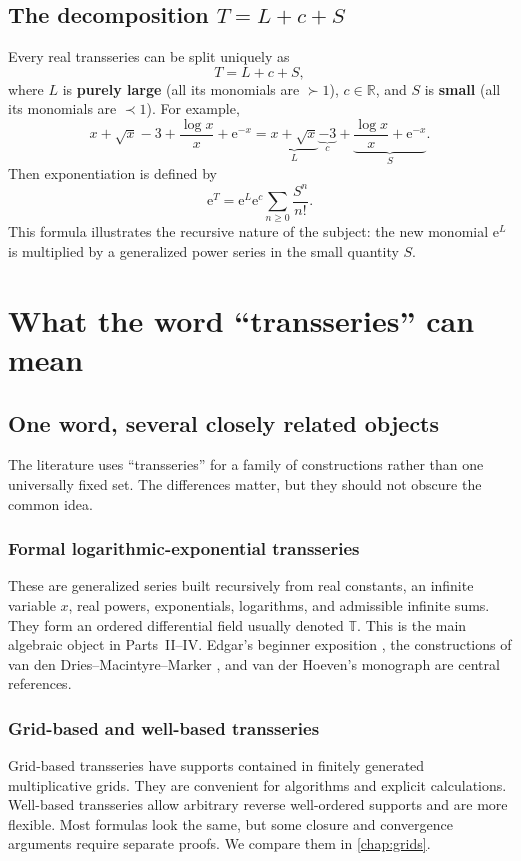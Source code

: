 \documentclass[11pt,openany]{book}
\theoremstyle{plain}
\theoremstyle{definition}
\theoremstyle{remark}
\newcommand{\R}{\mathbb{R}}
\newcommand{\Tfield}{\mathbb{T}}
\newcommand{\e}{\mathrm{e}}
\newcommand{\defterm}[1]{\textbf{#1}}
\begin{document}
\section{\texorpdfstring{The decomposition $T=L+c+S$}{The decomposition T=L+c+S}}
Every real transseries can be split uniquely as
\[
  T=L+c+S,
\]
where $L$ is \defterm{purely large} (all its monomials are $\succ1$), $c\in\R$, and $S$ is \defterm{small} (all its monomials are $\prec1$). For example,
\[
  x+\sqrt{x}-3+\frac{\log x}{x}+\e^{-x}
  =\underbrace{x+\sqrt{x}}_{L}
   \underbrace{-3}_{c}
   +\underbrace{\frac{\log x}{x}+\e^{-x}}_{S}.
\]
Then exponentiation is defined by
\[
  \e^T=\e^L\e^c\sum_{n\ge0}\frac{S^n}{n!}.
\]
This formula illustrates the recursive nature of the subject: the new monomial $\e^L$ is multiplied by a generalized power series in the small quantity $S$.

\chapter{What the word ``transseries'' can mean}

\section{One word, several closely related objects}
The literature uses ``transseries'' for a family of constructions rather than one universally fixed set. The differences matter, but they should not obscure the common idea.

\subsection{Formal logarithmic-exponential transseries}
These are generalized series built recursively from real constants, an infinite variable $x$, real powers, exponentials, logarithms, and admissible infinite sums. They form an ordered differential field usually denoted $\Tfield$. This is the main algebraic object in Parts~II--IV. Edgar's beginner exposition \cite{Edgar2009}, the constructions of van den Dries--Macintyre--Marker \cite{DMM1997,DMM2001}, and van der Hoeven's monograph \cite{Hoeven2006} are central references.

\subsection{Grid-based and well-based transseries}
Grid-based transseries have supports contained in finitely generated multiplicative grids. They are convenient for algorithms and explicit calculations. Well-based transseries allow arbitrary reverse well-ordered supports and are more flexible. Most formulas look the same, but some closure and convergence arguments require separate proofs. We compare them in \cref{chap:grids}.
\end{document}
